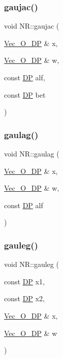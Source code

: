 \mbox{\label{namespaceNR_a95634e9b78b176caeec3321c0cfa6fbf}} 
\subsubsection{\texorpdfstring{gaujac()}{gaujac()}}
{\footnotesize\ttfamily void N\+R\+::gaujac (\begin{DoxyParamCaption}\item[{\mbox{\hyperlink{namespaceNR_a970094d23441f8ef6a45282a7eb2103d}{Vec\+\_\+\+O\+\_\+\+DP}} \&}]{x,  }\item[{\mbox{\hyperlink{namespaceNR_a970094d23441f8ef6a45282a7eb2103d}{Vec\+\_\+\+O\+\_\+\+DP}} \&}]{w,  }\item[{const \mbox{\hyperlink{namespaceNR_af6ff762dd605ff477b8e52387253a02a}{DP}}}]{alf,  }\item[{const \mbox{\hyperlink{namespaceNR_af6ff762dd605ff477b8e52387253a02a}{DP}}}]{bet }\end{DoxyParamCaption})}

\mbox{\label{namespaceNR_abd073d049f60560546572cb5cf2210ef}} 
\subsubsection{\texorpdfstring{gaulag()}{gaulag()}}
{\footnotesize\ttfamily void N\+R\+::gaulag (\begin{DoxyParamCaption}\item[{\mbox{\hyperlink{namespaceNR_a970094d23441f8ef6a45282a7eb2103d}{Vec\+\_\+\+O\+\_\+\+DP}} \&}]{x,  }\item[{\mbox{\hyperlink{namespaceNR_a970094d23441f8ef6a45282a7eb2103d}{Vec\+\_\+\+O\+\_\+\+DP}} \&}]{w,  }\item[{const \mbox{\hyperlink{namespaceNR_af6ff762dd605ff477b8e52387253a02a}{DP}}}]{alf }\end{DoxyParamCaption})}

\mbox{\label{namespaceNR_a722933d3ddfd7e76e9533892768ae542}} 
\subsubsection{\texorpdfstring{gauleg()}{gauleg()}}
{\footnotesize\ttfamily void N\+R\+::gauleg (\begin{DoxyParamCaption}\item[{const \mbox{\hyperlink{namespaceNR_af6ff762dd605ff477b8e52387253a02a}{DP}}}]{x1,  }\item[{const \mbox{\hyperlink{namespaceNR_af6ff762dd605ff477b8e52387253a02a}{DP}}}]{x2,  }\item[{\mbox{\hyperlink{namespaceNR_a970094d23441f8ef6a45282a7eb2103d}{Vec\+\_\+\+O\+\_\+\+DP}} \&}]{x,  }\item[{\mbox{\hyperlink{namespaceNR_a970094d23441f8ef6a45282a7eb2103d}{Vec\+\_\+\+O\+\_\+\+DP}} \&}]{w }\end{DoxyParamCaption})}

